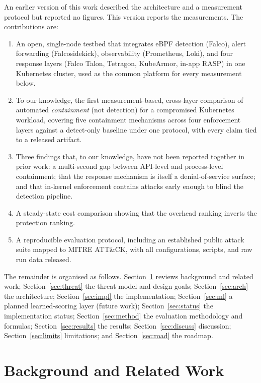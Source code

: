 \documentclass[10pt,conference]{IEEEtran}
\begin{document}
An earlier version of this work described the architecture and a measurement protocol but reported no figures. This version reports the measurements. The contributions are:
\begin{enumerate}
\item An open, single-node testbed that integrates eBPF detection (Falco), alert forwarding (Falcosidekick), observability (Prometheus, Loki), and four response layers (Falco Talon, Tetragon, KubeArmor, in-app RASP) in one Kubernetes cluster, used as the common platform for every measurement below.
\item To our knowledge, the first measurement-based, cross-layer comparison of automated \emph{containment} (not detection) for a compromised Kubernetes workload, covering five containment mechanisms across four enforcement layers against a detect-only baseline under one protocol, with every claim tied to a released artifact.
\item Three findings that, to our knowledge, have not been reported together in prior work: a multi-second gap between API-level and process-level containment; that the response mechanism is itself a denial-of-service surface; and that in-kernel enforcement contains attacks early enough to blind the detection pipeline.
\item A steady-state cost comparison showing that the overhead ranking inverts the protection ranking.
\item A reproducible evaluation protocol, including an established public attack suite mapped to MITRE ATT\&CK, with all configurations, scripts, and raw run data released.
\end{enumerate}

The remainder is organised as follows. Section~\ref{sec:related} reviews background and related work; Section~\ref{sec:threat} the threat model and design goals; Section~\ref{sec:arch} the architecture; Section~\ref{sec:impl} the implementation; Section~\ref{sec:ml} a planned learned-scoring layer (future work); Section~\ref{sec:status} the implementation status; Section~\ref{sec:method} the evaluation methodology and formulas; Section~\ref{sec:results} the results; Section~\ref{sec:discuss} discussion; Section~\ref{sec:limits} limitations; and Section~\ref{sec:road} the roadmap.

\section{Background and Related Work}\label{sec:related}
\end{document}
